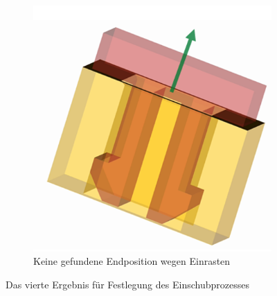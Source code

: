 \documentclass[14pt,a4paper,titlepage]{article}
\begin{document}
\begin{figure}[t!]
\begin{subfigure}{0.3\linewidth}
				\includegraphics[width=\linewidth]{result3.png}
				\caption{Keine gefundene Endposition wegen Einrasten}
			\end{subfigure}
			\caption{Das vierte Ergebnis für Festlegung des Einschubprozesses}
		\end{figure}
	\hfill
	\pagebreak[6]
\end{document}
